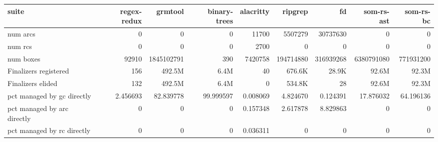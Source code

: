 \begin{tabular}{lrrrrrrrr}
\toprule
suite & regex-redux & grmtool & binary-trees & alacritty & ripgrep & fd & som-rs-ast & som-rs-bc \\
\midrule
num arcs & 0 & 0 & 0 & 11700 & 5507279 & 30737630 & 0 & 0 \\
num rcs & 0 & 0 & 0 & 2700 & 0 & 0 & 0 & 0 \\
num boxes & 92910 & 1845102791 & 390 & 7420758 & 194714880 & 316939268 & 6380791080 & 771931200 \\
Finalizers registered & 156 & 492.5M & 6.4M & 40 & 676.6K & 28.9K & 92.6M & 92.3M \\
Finalizers elided & 132 & 492.5M & 6.4M & 0 & 534.8K & 28 & 92.6M & 92.3M \\
pct managed by gc directly & 2.456693 & 82.839778 & 99.999597 & 0.008069 & 4.824670 & 0.124391 & 17.876032 & 64.196136 \\
pct managed by arc directly & 0 & 0 & 0 & 0.157348 & 2.617878 & 8.829863 & 0 & 0 \\
pct managed by rc directly & 0 & 0 & 0 & 0.036311 & 0 & 0 & 0 & 0 \\
\bottomrule
\end{tabular}
